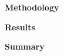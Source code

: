 \documentclass{amsart}
\theoremstyle{definition}
\begin{document}

\textbf{Methodology}











\textbf{Results}











\textbf{Summary}










\end{document}

